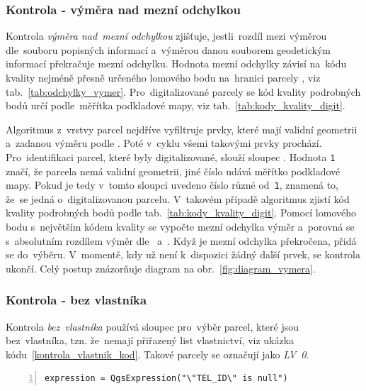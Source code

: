 \subsubsection{Kontrola - výměra nad mezní odchylkou}
\label{kontrola_vymera}

Kontrola \textit{výměra nad~mezní odchylkou} zjišťuje, jestli~rozdíl mezi výměrou dle~souboru popisných informací a~výměrou danou souborem geodetickým informací překračuje mezní odchylku. Hodnota mezní odchylky závisí na~kódu kvality nejméně přesně určeného lomového bodu na~hranici parcely \citep{vyhlaska_357}, viz tab.~\ref{tab:odchylky_vymer}. Pro~digitalizované parcely se kód kvality podrobných bodů určí podle~měřítka podkladové mapy, viz tab.~\ref{tab:kody_kvality_digit}.

Algoritmus z~vrstvy parcel nejdříve vyfiltruje prvky, které mají validní geometrii a~zadanou výměru podle . Poté v~cyklu všemi takovými prvky prochází. Pro~identifikaci parcel, které byly digitalizované, slouží sloupec \texttt{}. Hodnota \texttt{1} značí, že parcela nemá validní geometrii, jiné číslo udává měřítko podkladové mapy. Pokud je tedy v~tomto sloupci uvedeno číslo různé od~\texttt{1}, znamená to, že~se jedná o~digitalizovanou parcelu. V~takovém případě algoritmus zjistí kód kvality podrobných bodů podle tab.~\ref{tab:kody_kvality_digit}. Pomocí lomového bodu s~největším kódem kvality se vypočte mezní odchylka výměr a~porovná se s~absolutním rozdílem výměr dle~ a~. Když je mezní odchylka překročena, přidá se do~výběru. V~momentě, kdy už není k~dispozici žádný další prvek, se kontrola ukončí. Celý postup znázorňuje diagram na obr.~\ref{fig:diagram_vymera}.

\subsubsection{Kontrola - bez vlastníka}
\label{kontrola_bez_vlastnika}

Kontrola \textit{bez~vlastníka} používá sloupec \texttt{} pro~výběr parcel, které jsou bez~vlastníka, tzn. že~nemají přiřazený list vlastnictví, viz ukázka kódu~\ref{kontrola_vlastnik_kod}. Takové parcely se označují jako \textit{LV~0}.

{\scriptsize
\begin{lstlisting}[style=python, caption={Kontrola \textit{bez~vlastníka}~– vzorec pro~výběr prvků}, captionpos=b, label=kontrola_vlastnik_kod, backgroundcolor = \color{light-gray},  numbers=left]
expression = QgsExpression("\"TEL_ID\" is null")
\end{lstlisting}}

